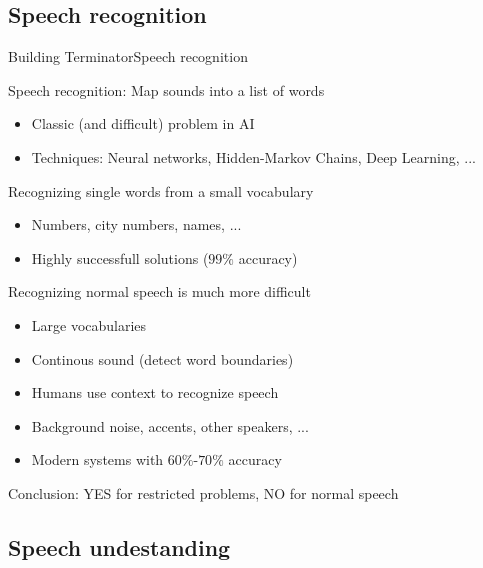 \documentclass[10pt,compress]{beamer} %
\begin{document}
\subsection{Speech recognition}
\begin{frame}{Building Terminator}{Speech recognition}
\footnotesize{
	Speech recognition: Map sounds into a list of words
	\begin{itemize}
		\item Classic (and difficult) problem in AI
		\item Techniques: Neural networks, Hidden-Markov Chains, Deep Learning, ...
	\end{itemize}
	Recognizing single words from a small vocabulary
	\begin{itemize}
		\item Numbers, city numbers, names, ...
		\item Highly successfull solutions ($99\%$ accuracy)
	\end{itemize}
	Recognizing normal speech is much more difficult
	\begin{itemize}
		\item Large vocabularies
		\item Continous sound (detect word boundaries)
		\item Humans use context to recognize speech
		\item Background noise, accents, other speakers, ...
		\item Modern systems with $60\%$-$70\%$ accuracy
	\end{itemize}
	Conclusion: YES for restricted problems, NO for normal speech
}
\end{frame}

\subsection{Speech undestanding}
\end{document}
